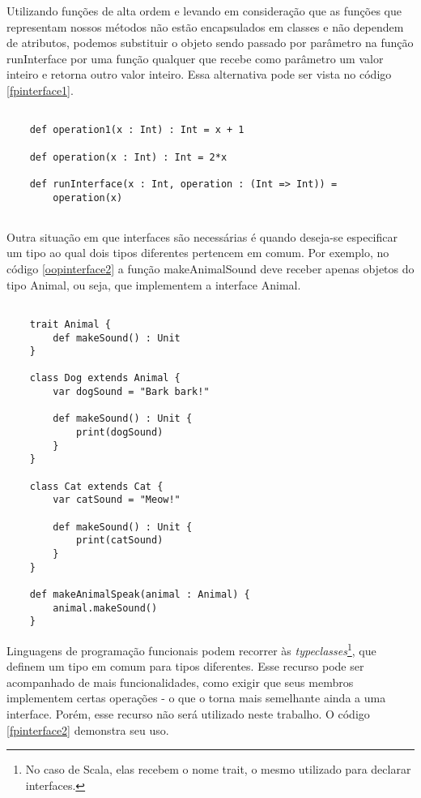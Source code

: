 Utilizando funções de alta ordem e levando em 
consideração que as funções que representam nossos 
métodos não estão encapsulados em classes e 
não dependem de atributos, podemos substituir o 
objeto sendo passado por parâmetro na função 
runInterface por uma função qualquer que recebe 
como parâmetro um valor inteiro e retorna outro 
valor inteiro. Essa alternativa pode ser vista 
no código \ref{fpinterface1}.

\begin{lstlisting}[caption={Interfaces em Programação Funcional},label=fpinterface1]
    
    def operation1(x : Int) : Int = x + 1

    def operation(x : Int) : Int = 2*x

    def runInterface(x : Int, operation : (Int => Int)) =
        operation(x)
    
\end{lstlisting}



Outra situação em que interfaces são necessárias 
é quando deseja-se especificar um tipo ao qual 
dois tipos diferentes pertencem em comum. Por 
exemplo, no código \ref{oopinterface2} a função 
makeAnimalSound deve receber apenas objetos 
do tipo Animal, ou seja, que implementem 
a interface Animal.

\begin{lstlisting}[caption={Interfaces em Orientação a Objetos},label=oopinterface2]
    
    trait Animal {
        def makeSound() : Unit
    }

    class Dog extends Animal {
        var dogSound = "Bark bark!"

        def makeSound() : Unit {
            print(dogSound)
        }
    }

    class Cat extends Cat {
        var catSound = "Meow!"

        def makeSound() : Unit {
            print(catSound)
        }
    }

    def makeAnimalSpeak(animal : Animal) {
        animal.makeSound()
    }

\end{lstlisting}

Linguagens de programação funcionais podem 
recorrer às \textit{typeclasses}\footnote{
    No caso de Scala, elas recebem o nome trait, 
    o mesmo utilizado para declarar interfaces.
}, que definem um tipo em comum para tipos 
diferentes. Esse recurso pode ser acompanhado 
de mais funcionalidades, como exigir que seus 
membros implementem certas operações - o que 
o torna mais semelhante ainda a uma interface. 
Porém, esse recurso não será utilizado neste 
trabalho. O código \ref{fpinterface2} demonstra 
seu uso.


